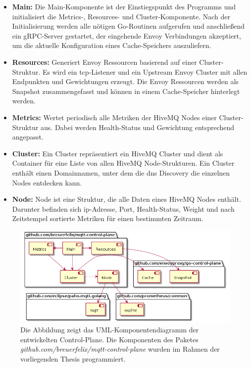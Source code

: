 \begin{itemize}
  \item \textbf{Main:} Die Main-Komponente ist der Einstiegspunkt des Programms und initialisiert die Metrics-, Resources- und Cluster-Komponente. Nach der Initialisierung werden alle nötigen Go-Routinen aufgerufen und anschlie{\ss}end ein gRPC-Server gestartet, der eingehende Envoy Verbindungen akzeptiert, um die aktuelle Konfiguration eines Cache-Speichers auszuliefern.
  \item \textbf{Resources:} Generiert Envoy Ressourcen basierend auf einer Cluster-Struktur. Es wird ein \ac{tcp}-Listener und ein Upstream Envoy Cluster mit allen Endpunkten und Gewichtungen erzeugt. Die Envoy Ressourcen werden als Snapshot zusammengefasst und können in einem Cache-Speicher hinterlegt werden.
\newpage
  \item \textbf{Metrics:} Wertet periodisch alle Metriken der HiveMQ Nodes einer Cluster-Struktur aus. Dabei werden Health-Status und Gewichtung entsprechend angepasst.
  \item \textbf{Cluster:} Ein Cluster repräsentiert ein HiveMQ Cluster und dient als Container für eine Liste von allen HiveMQ Node-Strukturen. Ein Cluster enthält einen Domainnamen, unter dem die \ac{dns} Discovery die einzelnen Nodes entdecken kann.
  \item \textbf{Node:} Node ist eine Struktur, die alle Daten eines HiveMQ Nodes enthält. Darunter befinden sich \ac{ip}-Adresse, Port, Health-Status, Weight und nach Zeitstempel sortierte Metriken für einen bestimmten Zeitraum.
\end{itemize}
\begin{figure}[h]
    \centering
    \includegraphics[scale=0.5]{gen/component-diagram.png}
    \caption{Die Abbildung zeigt das UML-Komponentendiagramm der entwickelten Control-Plane. Die Komponenten des Paketes \textit{github.com/breuerfelix/mqtt-control-plane} wurden im Rahmen der vorliegenden Thesis programmiert.}
    \label{fig:component-diagram}
\end{figure}
